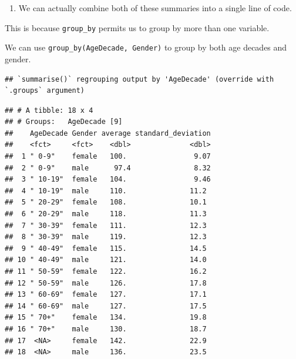 \documentclass[
]{article}
\newenvironment{Shaded}{\begin{snugshade}}{\end{snugshade}}
\newcommand{\DataTypeTok}[1]{\textcolor[rgb]{0.13,0.29,0.53}{#1}}
\newcommand{\KeywordTok}[1]{\textcolor[rgb]{0.13,0.29,0.53}{\textbf{#1}}}
\newcommand{\NormalTok}[1]{#1}
\newcommand{\OperatorTok}[1]{\textcolor[rgb]{0.81,0.36,0.00}{\textbf{#1}}}
\newcommand{\OtherTok}[1]{\textcolor[rgb]{0.56,0.35,0.01}{#1}}
\newcommand{\StringTok}[1]{\textcolor[rgb]{0.31,0.60,0.02}{#1}}
\providecommand{\tightlist}{%
  \setlength{\itemsep}{0pt}\setlength{\parskip}{0pt}}
\begin{document}
\begin{enumerate}
\def\labelenumi{\arabic{enumi}.}
\setcounter{enumi}{6}
\tightlist
\item
  We can actually combine both of these summaries into a single line of
  code.
\end{enumerate}

This is because \texttt{group\_by} permits us to group by more than one
variable.

We can use \texttt{group\_by(AgeDecade,\ Gender)} to group by both age
decades and gender.

\begin{Shaded}
\end{Shaded}

\begin{verbatim}
## `summarise()` regrouping output by 'AgeDecade' (override with `.groups` argument)
\end{verbatim}

\begin{verbatim}
## # A tibble: 18 x 4
## # Groups:   AgeDecade [9]
##    AgeDecade Gender average standard_deviation
##    <fct>     <fct>    <dbl>              <dbl>
##  1 " 0-9"    female   100.                9.07
##  2 " 0-9"    male      97.4               8.32
##  3 " 10-19"  female   104.                9.46
##  4 " 10-19"  male     110.               11.2 
##  5 " 20-29"  female   108.               10.1 
##  6 " 20-29"  male     118.               11.3 
##  7 " 30-39"  female   111.               12.3 
##  8 " 30-39"  male     119.               12.3 
##  9 " 40-49"  female   115.               14.5 
## 10 " 40-49"  male     121.               14.0 
## 11 " 50-59"  female   122.               16.2 
## 12 " 50-59"  male     126.               17.8 
## 13 " 60-69"  female   127.               17.1 
## 14 " 60-69"  male     127.               17.5 
## 15 " 70+"    female   134.               19.8 
## 16 " 70+"    male     130.               18.7 
## 17  <NA>     female   142.               22.9 
## 18  <NA>     male     136.               23.5
\end{verbatim}
\end{document}
